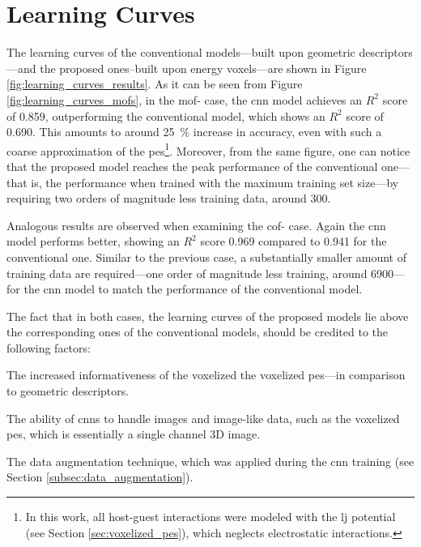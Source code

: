 \section{Learning Curves}

The learning curves of the conventional models---built
upon geometric descriptors---and the proposed ones--built upon energy
voxels---are shown in Figure \ref{fig:learning_curves_results}. As it can be
seen from Figure \ref{fig:learning_curves_mofs}, in the \gls{mof}- case,
the \gls{cnn} model achieves an $R^2$ score of \num{0.859}, outperforming the
conventional model, which shows an $R^2$ score of \num{0.690}. This amounts to
around \SI{25}{\percent} increase in accuracy, even with such a coarse
approximation of the \gls{pes}\footnote{In this work, all host-guest
interactions were modeled with the \gls{lj} potential (see Section
\ref{sec:voxelized_pes}), which neglects electrostatic interactions.}. Moreover,
from the same figure, one can notice that the proposed model reaches the peak
performance of the conventional one---that is, the performance when trained with
the maximum training set size---by requiring two orders of magnitude less
training data, around \num{300}.

Analogous results are observed when examining the \gls{cof}- case. Again
the \gls{cnn} model performs better, showing an $R^2$ score \num{0.969} compared
to \num{0.941} for the conventional one. Similar to the previous case, a
substantially smaller amount of training data are required---one order of
magnitude less training, around \num{6900}---for the \gls{cnn} model to match
the performance of the conventional model.

The fact that in both cases, the learning curves of the proposed models lie
above the corresponding ones of the conventional models, should be credited to
the following factors:
\begin{enumerate*}[label=\roman*).]
	\item The increased informativeness of the voxelized the voxelized
		\gls{pes}---in comparison to geometric descriptors.
	\item The ability of \glspl{cnn} to handle images and image-like
		data, such as the voxelized \gls{pes}, which is
		essentially a single channel 3D image.
	\item The data augmentation technique, which was
		applied during the \gls{cnn} training (see Section
		\ref{subsec:data_augmentation}).
\end{enumerate*}

